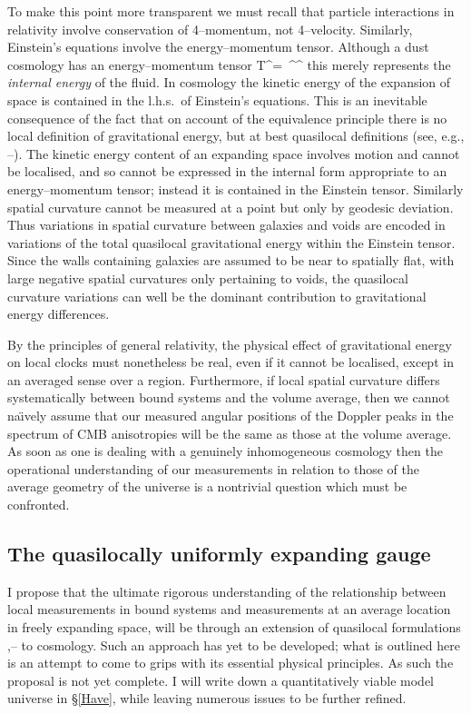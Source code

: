 \documentclass[12pt]{article}
\begin{document}
To make this point more transparent we must recall that particle interactions
in relativity involve conservation of 4--momentum, not 4--velocity. Similarly,
Einstein's equations involve the energy--momentum tensor.
Although a dust cosmology has an energy--momentum tensor
\beq T^{\mu\nu}=\rh\, \bn^\mu\bn^\nu\label{stress}\eeq
this merely represents the {\em internal energy} of the fluid. In cosmology
the kinetic energy of the expansion of space is contained in the l.h.s.\ of
Einstein's equations. This is an inevitable consequence of the fact that on
account of the equivalence principle there is no local definition of
gravitational energy, but at best quasilocal definitions (see, e.g.,
\cite{quasi_rev}--\cite{quasi2}). The kinetic energy content of an expanding
space involves motion and cannot be localised, and so cannot be expressed
in the internal form appropriate to an energy--momentum tensor; instead it
is contained in the Einstein tensor. Similarly spatial curvature cannot
be measured at a point but only by geodesic deviation. Thus variations in
spatial curvature between galaxies and voids are encoded in variations
of the total quasilocal gravitational energy within the Einstein tensor.
Since the walls containing galaxies are assumed to be near
to spatially flat, with large negative spatial curvatures only pertaining to
voids, the quasilocal curvature variations can well be the dominant
contribution to gravitational energy differences.

By the principles of general relativity, the physical effect of gravitational
energy on local clocks must nonetheless be real, even if it cannot be
localised, except in an averaged sense over a region. Furthermore, if
local spatial curvature differs systematically between bound systems and
the volume average, then we cannot na\"{\i}vely assume that our measured
angular positions of the Doppler peaks in the spectrum of CMB anisotropies
will be the same as those at the volume average. As soon as one
is dealing with a genuinely inhomogeneous cosmology then the operational
understanding of our measurements in relation to those of the average
geometry of the universe is a nontrivial question which must be confronted.

\subsection{The quasilocally uniformly expanding gauge\label{quasiexp}}

I propose that the ultimate rigorous understanding of the relationship
between local measurements in bound systems and measurements at an average
location in freely expanding space, will be through an extension of quasilocal
formulations \cite{KLB},\cite{quasi_rev}--\cite{quasi2} to cosmology. Such an
approach has yet to be developed; what is outlined here is an attempt
to come to grips with its essential physical principles. As such the
proposal is not yet complete. I will write down a quantitatively viable model
universe in \S\ref{Have}, while leaving numerous issues to be further
refined.
\end{document}
